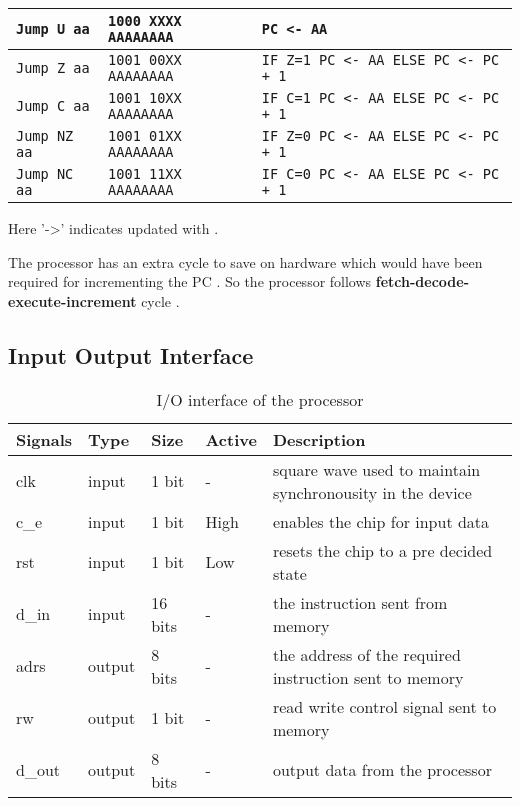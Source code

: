 \documentclass[11pt]{article}
\begin{document}
\begin{longtable}{|l|l|l|}
              \texttt{Jump U aa} &  \texttt{1000 XXXX AAAAAAAA} & \texttt{PC <- AA} \\ \hline
              
              \texttt{Jump Z aa} &  \texttt{1001 00XX AAAAAAAA} & \texttt{IF Z=1 PC <- AA ELSE PC <- PC + 1} \\ \hline
              
              \texttt{Jump C aa} &  \texttt{1001 10XX AAAAAAAA} & \texttt{IF C=1 PC <- AA ELSE PC <- PC + 1} \\ \hline
              
              \texttt{Jump NZ aa} &  \texttt{1001 01XX AAAAAAAA} & \texttt{IF Z=0 PC <- AA ELSE PC <- PC + 1} \\ \hline
              
              \texttt{Jump NC aa} &  \texttt{1001 11XX AAAAAAAA} & \texttt{IF C=0 PC <- AA ELSE PC <- PC + 1}\\ \hline
              
\end{longtable}


Here '->' indicates updated with .

The processor has an extra cycle to save on hardware which would have been required for incrementing the PC . So the processor follows \textbf{fetch-decode-execute-increment} cycle .   
\vspace*{40mm}
\subsection{Input Output Interface}
\begin{table}[H]
  \begin{center}
    \caption{I/O interface of the processor}  
    \vspace*{5mm}
    \begin{tabular}{||l|l|l||l|l||}
      \hline
          {\bf Signals} & { \bf Type } & {\bf Size} & {\bf Active} &{\bf Description}   \\ \hline
            clk          & input  & 1 bit   & -     &  square wave used to maintain synchronousity in the device \\ \hline
            c\_e         & input  & 1 bit   & High  &  enables the chip for input data  \\ \hline
            rst          & input  & 1 bit   & Low   &  resets the chip to a pre decided state \\ \hline
            [15:0] d\_in & input  & 16 bits & -     &  the instruction sent from memory \\ \hline
            [7:0] adrs   & output & 8 bits  & -     &  the address of the required instruction sent to memory \\ \hline
            rw           & output & 1 bit   & -     &  read write control signal sent to memory \\ \hline
            [7:0] d\_out & output & 8 bits  & -     &  output data from the processor \\ \hline
    \end{tabular}
  \end{center}
\end{table}
\end{document}
